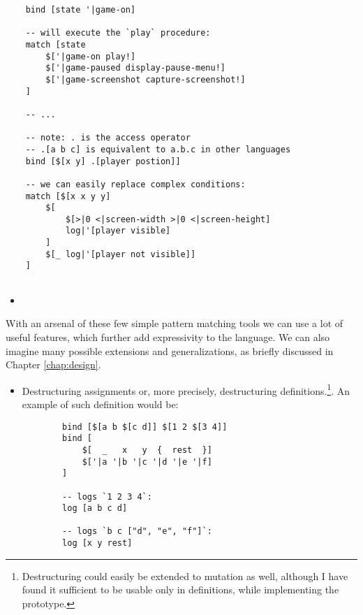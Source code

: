 \begin{lstlisting}
    bind [state '|game-on]
    
    -- will execute the `play` procedure:
    match [state
        $['|game-on play!]
        $['|game-paused display-pause-menu!]
        $['|game-screenshot capture-screenshot!]
    ]
    
    -- ...

    -- note: . is the access operator
    -- .[a b c] is equivalent to a.b.c in other languages
    bind [$[x y] .[player postion]]
    
    -- we can easily replace complex conditions:
    match [$[x x y y]
        $[
            $[>|0 <|screen-width >|0 <|screen-height]
            log|'[player visible]
        ]
        $[_ log|'[player not visible]]
    ]
    
\end{lstlisting}
\begin{itemize}
    \item 
\end{itemize}

With an arsenal of these few simple pattern matching tools we can use a lot of useful features, which further add expressivity to the language. We can also imagine many possible extensions and generalizations, as briefly discussed in Chapter \ref{chap:design}.

\begin{itemize}
    \item Destructuring assignments or, more precisely, destructuring definitions.\footnote{Destructuring could easily be extended to mutation as well, although I have found it sufficient to be usable only in definitions, while implementing the prototype.}. An example of such definition would be:
    \begin{lstlisting}
        bind [$[a b $[c d]] $[1 2 $[3 4]]
        bind [
            $[  _   x   y  {  rest  }]
            $['|a '|b '|c '|d '|e '|f]
        ]
        
        -- logs `1 2 3 4`:
        log [a b c d]
        
        -- logs `b c ["d", "e", "f"]`:
        log [x y rest]
    \end{lstlisting}
\end{itemize}


